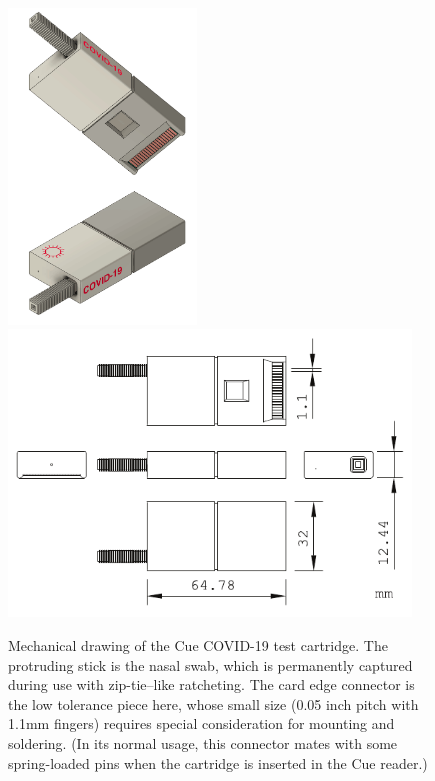 \documentclass[twocolumn]{article}
\begin{document}
\begin{figure}[tp]
  \centering
  \includegraphics[height=3.3in]{cuetechnicalcolor}  
  \includegraphics[height=3in]{cuetechnical}
  \caption{ Mechanical drawing of the Cue COVID-19 test cartridge. The
    protruding stick is the nasal swab, which is permanently captured
    during use with zip-tie--like ratcheting. The card edge connector
    is the low tolerance piece here, whose small size (0.05 inch pitch
    with 1.1mm fingers) requires special consideration for mounting
    and soldering. (In its normal usage, this connector mates with
    some spring-loaded pins when the cartridge is inserted in the Cue
    reader.) } \label{fig:cuetechnical}
\end{figure}
\end{document}

